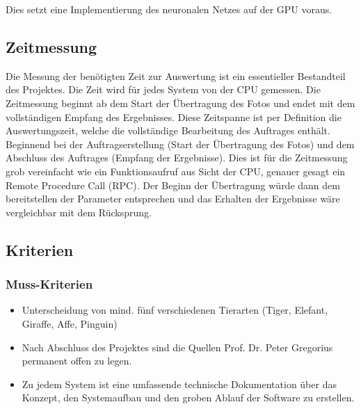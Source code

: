 Dies setzt eine Implementierung des neuronalen Netzes auf der GPU voraus.  


\subsection{Zeitmessung}

Die Messung der benötigten Zeit zur Auswertung ist ein essentieller Bestandteil des Projektes. Die Zeit wird für jedes System von der CPU gemessen. Die Zeitmessung beginnt ab dem Start der Übertragung des Fotos und endet mit dem vollständigen Empfang des Ergebnisses. Diese Zeitspanne ist per Definition die Auswertungszeit, welche die vollständige Bearbeitung des Auftrages enthält. Beginnend bei der Auftragserstellung (Start der Übertragung des Fotos) und dem Abschluss des Auftrages (Empfang der Ergebnisse). Dies ist für die Zeitmessung grob vereinfacht wie ein Funktionsaufruf aus Sicht der CPU,  genauer gesagt ein Remote Procedure Call (RPC). Der Beginn der Übertragung würde dann dem bereitstellen der Parameter entsprechen und das Erhalten der Ergebnisse wäre vergleichbar mit dem Rücksprung.

\newpage


\subsection{Kriterien}

\vspace{0.8cm}


\subsubsection{Muss-Kriterien}

\vspace{0.5cm}

\begin{itemize}
	\item Unterscheidung von mind. fünf verschiedenen Tierarten (Tiger, Elefant, Giraffe, Affe, Pinguin)
	\item Nach Abschluss des Projektes sind die Quellen Prof. Dr. Peter Gregorius permanent offen zu legen.
	\item Zu jedem System ist eine umfassende technische Dokumentation über das Konzept, den Systemaufbau und den groben Ablauf der Software zu erstellen.
\end{itemize}

